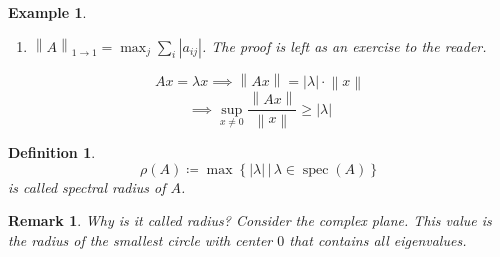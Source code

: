 \documentclass{article}
\newtheorem{example}{Example}  \numberwithin{example}{section}
\newtheorem{definition}{Definition}  \numberwithin{definition}{section}
\newtheorem*{claim}{Claim}%
\newtheorem{remark}{Remark}  \numberwithin{remark}{section}
\newcommand{\set}[1]{\left\{#1\right\}}
\newcommand{\setdef}[2]{\left\{\left.#1\,\right|\,#2\right\}}
\newcommand{\norm}[1]{\left\|#1\right\|}
\newcommand{\card}[1]{\left|#1\right|}
\begin{document}
\begin{example}
\begin{enumerate}
\begin{claim}
        $\norm{A}_{\infty\to\infty} = \max_i \sum_j \card{a_{ij}}$
      \end{claim}
      \begin{proof}
        Find vector $\tilde x$ such that $\norm{A\tilde x}_{\infty} = \max_i \sum_j \card{a_{ij}} \cdot \norm{\tilde x}_{\infty}$. Choose $i_0$ such that $\sum_i \card{a_{ij}} = \max!$.
        \[ \tilde x_j = \begin{cases} \frac{\card{a_{i_0 j}}}{a_{i_0 j}} & a_{i_0 j} \neq 0 \\ 0 & \text{else} \end{cases} \]
        $\tilde x_j$ are not all zero, $\card{\tilde x_j} \in \set{0,1} \forall j$.
        \begin{align*}
          (A \cdot \tilde x)_{i_0} &= \sum_j a_{i_0 j} \tilde x_j = \sum_j a_{i_0 j} a_{i_0 j} \frac{\card{a_{i_0 j}}}{a_{i_0 j}} = \sum_j \card{a_{i_0 j}} = \max_i \sum \card{a_{ij}} \\
            &\implies \norm{A \tilde x}_{\infty} \geq \card{(A \tilde x)_{i_0}} = \max_i \sum \card{a_{ij}} \cdot \underbrace{\norm{\tilde x}_{\infty}}_{=1} \\
            &\implies \norm{A}_{\infty\to\infty} \geq \max_i \sum_j \card{a_{ij}} \\
            &\implies \norm{A}_{\infty\to\infty} = \max_i \sum_j \card{a_{ij}} = \max\setdef{\norm{z_i}_1}{z_i \text{ row of } A}
        \end{align*}
      \end{proof}
    \item $\norm{A}_{1 \to 1} = \max_j \sum_i \card{a_{ij}}$.
      The proof is left as an exercise to the reader.
  \end{enumerate}
\end{example}

\[ Ax = \lambda x \implies \norm{Ax} = \card{\lambda} \cdot \norm{x} \]
\[ \implies \sup_{x \neq 0} \frac{\norm{Ax}}{\norm{x}} \geq \card{\lambda} \]

\begin{definition} %
  \[ \rho(A) \coloneqq \max \setdef{\card{\lambda}}{\lambda \in \operatorname{spec}(A)} \]
  is called \emph{spectral radius} of $A$.
\end{definition}

\begin{remark}
  Why is it called radius? Consider the complex plane. This value is the radius of the smallest circle with center $0$ that contains all eigenvalues.
\end{remark}
\end{document}

